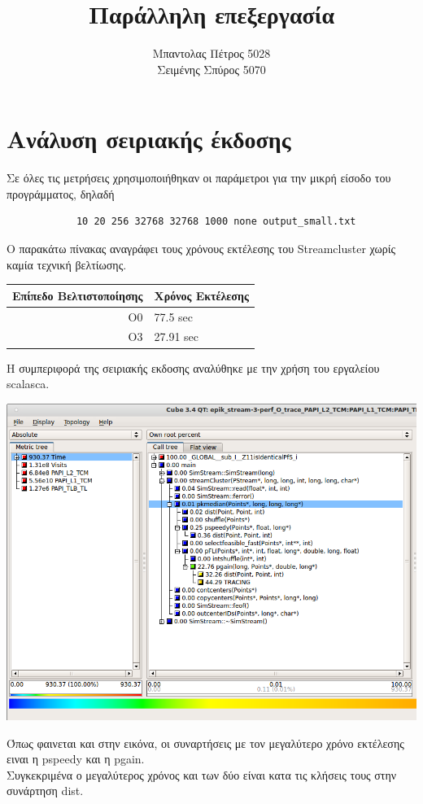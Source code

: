 \documentclass[a4paper,11pt]{article}
\title{Παράλληλη επεξεργασία}
\author{Μπαντολας Πέτρος 5028\\Σειμένης Σπύρος 5070}
\date{}
\begin{document}
\maketitle
\section{Ανάλυση σειριακής έκδοσης}

\begin{itshape}
    Σε όλες τις μετρήσεις χρησιμοποιήθηκαν οι παράμετροι για την μικρή είσοδο του προγράμματος, δηλαδή
\end{itshape}
\begin{lstlisting}
            10 20 256 32768 32768 1000 none output_small.txt
\end{lstlisting}

Ο παρακάτω πίνακας αναγράφει τους χρόνους εκτέλεσης του Streamcluster χωρίς καμία τεχνική βελτίωσης.

\begin{center}
\begin{tabular}{|r|l|}
    \hline
    Επίπεδο Βελτιστοποίησης & Χρόνος Εκτέλεσης \\ \hline
    O0 & 77.5 sec \\
    O3 & 27.91 sec \\ \hline
\end{tabular}
\end{center}

Η συμπεριφορά της σειριακής εκδοσης αναλύθηκε με την χρήση του εργαλείου scalasca.
\begin{center}
\includegraphics[scale=0.5]{../scrshots/time.png}
\end{center} 
Όπως φαινεται και στην εικόνα, οι συναρτήσεις με τον μεγαλύτερο χρόνο εκτέλεσης ειναι η pspeedy και η pgain.\\
Συγκεκριμένα ο μεγαλύτερος χρόνος και των δύο είναι κατα τις κλήσεις τους στην συνάρτηση dist.
\end{document}
